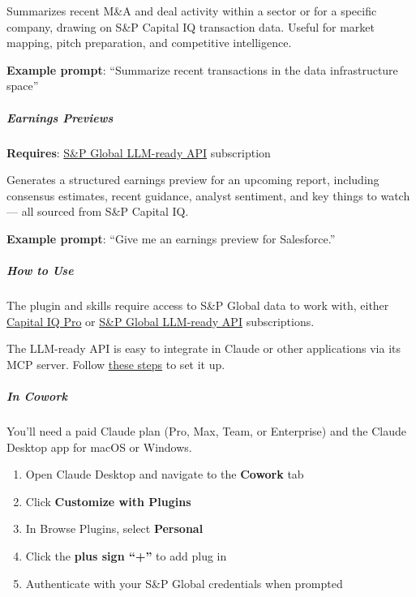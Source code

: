 \documentclass[11pt]{article}
\begin{document}
Summarizes recent M\&A and deal activity within a sector or for a specific company, drawing on S\&P Capital IQ transaction data. Useful for market mapping, pitch preparation, and competitive intelligence.


\textbf{Example prompt}: ``Summarize recent transactions in the data infrastructure space”


\subparagraph{Earnings Previews}\mbox{}\par
\textbf{Requires}: \href{https://www.marketplace.spglobal.com/en/solutions/kensho-llm-ready-api-\%28a156fe9f-5564-4f60-a624-95d8645dc98f\%29}{S\&P Global LLM-ready API} subscription


Generates a structured earnings preview for an upcoming report, including consensus estimates, recent guidance, analyst sentiment, and key things to watch — all sourced from S\&P Capital IQ.


\textbf{Example prompt}: ``Give me an earnings preview for Salesforce.''


\subparagraph{How to Use}\mbox{}\par
The plugin and skills require access to S\&P Global data to work with, either \href{https://www.spglobal.com/market-intelligence/en/solutions/products/sp-capital-iq-pro}{Capital IQ Pro} or \href{https://www.marketplace.spglobal.com/en/solutions/kensho-llm-ready-api-\%28a156fe9f-5564-4f60-a624-95d8645dc98f\%29}{S\&P Global LLM-ready API} subscriptions.


The LLM-ready API is easy to integrate in Claude or other applications via its MCP server. Follow \href{docs.kensho.com/llmreadyapi/mcp/third-party/claude}{these steps} to set it up.


\subparagraph{In Cowork}\mbox{}\par
You'll need a paid Claude plan (Pro, Max, Team, or Enterprise) and the Claude Desktop app for macOS or Windows.


\begin{enumerate}[leftmargin=*,itemsep=2pt,topsep=2pt]
\item {} Open Claude Desktop and navigate to the \textbf{Cowork} tab
\item {} Click \textbf{Customize with Plugins}
\item {} In Browse Plugins, select \textbf{Personal}
\item {} Click the \textbf{plus sign “+”} to add plug in
\item {} Authenticate with your S\&P Global credentials when prompted
\end{enumerate}
\end{document}

